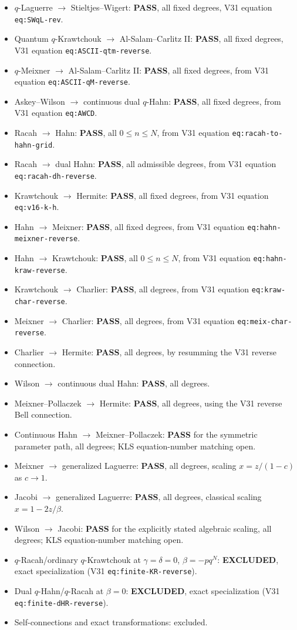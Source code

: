 \documentclass[11pt]{article}
\begin{document}
\begin{itemize}
\item $q$-Laguerre $\to$ Stieltjes--Wigert: \textbf{PASS}, all fixed degrees, V31 equation \texttt{eq:SWqL-rev}.
\item Quantum $q$-Krawtchouk $\to$ Al-Salam--Carlitz II: \textbf{PASS}, all fixed degrees, V31 equation \texttt{eq:ASCII-qtm-reverse}.
\item $q$-Meixner $\to$ Al-Salam--Carlitz II: \textbf{PASS}, all fixed degrees, from V31 equation \texttt{eq:ASCII-qM-reverse}.
\item Askey--Wilson $\to$ continuous dual $q$-Hahn: \textbf{PASS}, all fixed degrees, from V31 equation \texttt{eq:AWCD}.
\item Racah $\to$ Hahn: \textbf{PASS}, all $0\le n\le N$, from V31 equation \texttt{eq:racah-to-hahn-grid}.
\item Racah $\to$ dual Hahn: \textbf{PASS}, all admissible degrees, from V31 equation \texttt{eq:racah-dh-reverse}.
\item Krawtchouk $\to$ Hermite: \textbf{PASS}, all fixed degrees, from V31 equation \texttt{eq:v16-k-h}.
\item Hahn $\to$ Meixner: \textbf{PASS}, all fixed degrees, from V31 equation \texttt{eq:hahn-meixner-reverse}.
\item Hahn $\to$ Krawtchouk: \textbf{PASS}, all $0\le n\le N$, from V31 equation \texttt{eq:hahn-kraw-reverse}.
\item Krawtchouk $\to$ Charlier: \textbf{PASS}, all degrees, from V31 equation \texttt{eq:kraw-char-reverse}.
\item Meixner $\to$ Charlier: \textbf{PASS}, all degrees, from V31 equation \texttt{eq:meix-char-reverse}.
\item Charlier $\to$ Hermite: \textbf{PASS}, all degrees, by resumming the V31 reverse connection.
\item Wilson $\to$ continuous dual Hahn: \textbf{PASS}, all degrees.
\item Meixner--Pollaczek $\to$ Hermite: \textbf{PASS}, all degrees, using the V31 reverse Bell connection.
\item Continuous Hahn $\to$ Meixner--Pollaczek: \textbf{PASS} for the
symmetric parameter path, all degrees; KLS equation-number matching open.
\item Meixner $\to$ generalized Laguerre: \textbf{PASS}, all degrees, scaling $x=z/(1-c)$ as $c\to1$.
\item Jacobi $\to$ generalized Laguerre: \textbf{PASS}, all degrees, classical scaling $x=1-2z/\beta$.
\item Wilson $\to$ Jacobi: \textbf{PASS} for the explicitly stated
algebraic scaling, all degrees; KLS equation-number matching open.
\item $q$-Racah/ordinary $q$-Krawtchouk at $\gamma=\delta=0$, $\beta=-pq^N$: \textbf{EXCLUDED}, exact specialization (V31 \texttt{eq:finite-KR-reverse}).
\item Dual $q$-Hahn/$q$-Racah at $\beta=0$: \textbf{EXCLUDED}, exact specialization (V31 \texttt{eq:finite-dHR-reverse}).
\item Self-connections and exact transformations: excluded.
\end{itemize}
\end{document}
